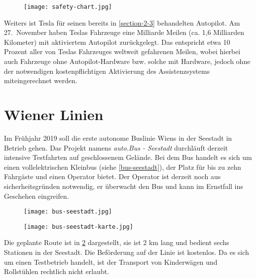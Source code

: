 \begin{figure}\centering
  \texttt{[image: safety-chart.jpg]}
  \label{safety-chart}
\end{figure}

Weiters ist Tesla für seinen bereits in \ref{section-2-3} behandelten Autopilot. Am 27.\ November haben Teslas Fahrzeuge eine Milliarde Meilen (ca. 1,6 Milliarden Kilometer) mit aktiviertem Autopilot zurückgelegt. Das entspricht etwa 10 Prozent aller von Teslas Fahrzeuges weltweit gefahrenen Meilen, wobei hierbei auch Fahrzeuge ohne Autopilot-Hardware bzw. solche mit Hardware, jedoch ohne der notwendigen kostenpflichtigen Aktivierung des Assistenzsystems miteingerechnet werden. 


\section{Wiener Linien}

Im Frühjahr 2019 soll die erste autonome Buslinie Wiens in der Seestadt in Betrieb gehen. Das Projekt namens \emph{auto.Bus - Seestadt} durchläuft derzeit intensive Testfahrten auf geschlossenem Gelände. Bei dem Bus handelt es sich um einen vollelektrischen Kleinbus (siehe \ref{bus-seestadt}), der Platz für bis zu zehn Fahrgäste und einen Operator bietet. Der Operator ist derzeit noch aus sicherheitsgründen notwendig, er überwacht den Bus und kann im Ernstfall ins Geschehen eingreifen. 

\begin{figure}\centering
  \texttt{[image: bus-seestadt.jpg]}
  \label{bus-seestadt}

  \texttt{[image: bus-seestadt-karte.jpg]}
  \label{bus-seestadt-karte}
\end{figure}

Die geplante Route ist in \ref{bus-seestadt-karte} dargestellt, sie ist 2 \si{\kilo\metre} lang und bedient sechs Stationen in der Seestadt. Die Beförderung auf der Linie ist kostenlos. Da es sich um einen Testbetrieb handelt, ist der Transport von Kinderwägen und Rollstühlen rechtlich nicht erlaubt.


